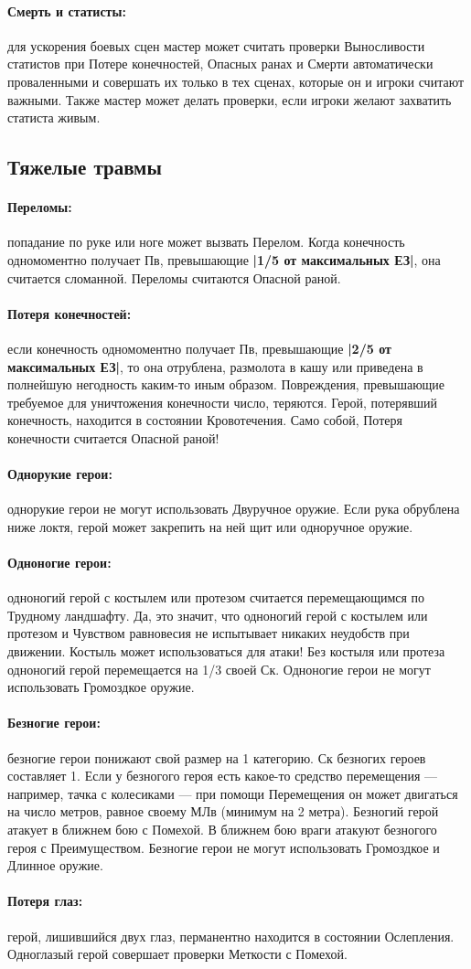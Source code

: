 \paragraph{Смерть и статисты:} для ускорения боевых сцен мастер может считать проверки Выносливости статистов при Потере конечностей, Опасных ранах и Смерти автоматически проваленными и совершать их только в тех сценах, которые он и игроки считают важными. Также мастер может делать проверки, если игроки желают захватить статиста живым.
\subsection{Тяжелые травмы}
\paragraph{Переломы:} попадание по руке или ноге может вызвать Перелом. Когда конечность одномоментно получает Пв, превышающие \textbf{|1/5 от максимальных ЕЗ|}, она считается сломанной. Переломы считаются Опасной раной.
\paragraph{Потеря конечностей:} если конечность одномоментно получает Пв, превышающие \textbf{|2/5 от максимальных ЕЗ|}, то она отрублена, размолота в кашу или приведена в полнейшую негодность каким-то иным образом. Повреждения, превышающие требуемое для уничтожения конечности число, теряются. Герой, потерявший конечность, находится в состоянии Кровотечения. Само собой, Потеря конечности считается Опасной раной!
\paragraph{Однорукие герои:} однорукие герои не могут использовать Двуручное оружие. Если рука обрублена ниже локтя, герой может закрепить на ней щит или одноручное оружие.
\paragraph{Одноногие герои:} одноногий герой с костылем или протезом считается перемещающимся по Трудному ландшафту. Да, это значит, что одноногий герой с костылем или протезом и Чувством равновесия не испытывает никаких неудобств при движении. Костыль может использоваться для атаки! Без костыля или протеза одноногий герой перемещается на 1/3 своей Ск. Одноногие герои не могут использовать Громоздкое оружие.
\paragraph{Безногие герои:} безногие герои понижают свой размер на 1 категорию. Ск безногих героев составляет 1. Если у безногого героя есть какое-то средство перемещения — например, тачка с колесиками — при помощи Перемещения он может двигаться на число метров, равное своему МЛв (минимум на 2 метра). Безногий герой атакует в ближнем бою с Помехой. В ближнем бою враги атакуют безногого героя с Преимуществом. Безногие герои не могут использовать Громоздкое и Длинное оружие.
\paragraph{Потеря глаз:} герой, лишившийся двух глаз, перманентно находится в состоянии Ослепления. Одноглазый герой совершает проверки Меткости с Помехой.